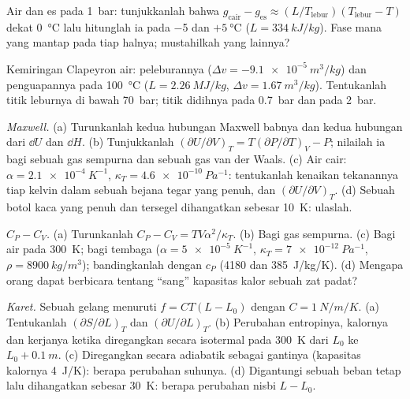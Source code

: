 \begin{exercise}[$\star$]\label{exo:b2:thermodynamic-potentials:3}
Air dan es pada \qty{1}{bar}: tunjukkanlah bahwa $g_{\text{cair}} - g_{\text{es}} \approx
(L/T_{\text{lebur}})(T_{\text{lebur}} - T)$ dekat \qty{0}{\celsius} lalu hitunglah ia
pada \qty{-5}{} dan $+\qty{5}{\celsius}$ ($L = \qty{334}{kJ/kg}$). Fase mana yang
mantap pada tiap halnya; mustahilkah yang lainnya?
\end{exercise}

\begin{exercise}[$\star$]\label{exo:b2:thermodynamic-potentials:4}
Kemiringan Clapeyron air: peleburannya ($\Delta v = -\qty{9.1e-5}{m^3/kg}$) dan
penguapannya pada \qty{100}{\celsius} ($L = \qty{2.26}{MJ/kg}$, $\Delta v =
\qty{1.67}{m^3/kg}$). Tentukanlah titik leburnya di bawah \qty{70}{bar}; titik didihnya pada
\qty{0.7}{bar} dan pada \qty{2}{bar}.
\end{exercise}

\begin{exercise}[$\star\star$]\label{exo:b2:thermodynamic-potentials:5}
\emph{Maxwell.} (a) Turunkanlah kedua hubungan Maxwell babnya
dan kedua hubungan dari $\dd U$ dan $\dd H$. (b) Tunjukkanlah $(\partial U/\partial V)_T =
T(\partial P/\partial T)_V - P$; nilailah ia bagi sebuah gas sempurna dan sebuah gas van
der Waals. (c) Air cair: $\alpha = \qty{2.1e-4}{K^{-1}}$, $\kappa_T =
\qty{4.6e-10}{Pa^{-1}}$: tentukanlah kenaikan tekanannya tiap kelvin dalam sebuah bejana tegar yang penuh,
dan $(\partial U/\partial V)_T$. (d) Sebuah botol kaca yang penuh dan tersegel dihangatkan
sebesar \qty{10}{K}: ulaslah.
\end{exercise}

\begin{exercise}[$\star\star$]\label{exo:b2:thermodynamic-potentials:6}
\emph{$C_P - C_V$.} (a) Turunkanlah $C_P - C_V = TV\alpha^2/\kappa_T$. (b)
Bagi gas sempurna. (c) Bagi air pada \qty{300}{K}; bagi tembaga ($\alpha = \qty{5e-5}{K^{-1}}$,
$\kappa_T = \qty{7e-12}{Pa^{-1}}$, $\rho = \qty{8900}{kg/m^3}$); bandingkanlah dengan
$c_P$ (\qty{4180}{} dan \qty{385}{J/kg/K}). (d) Mengapa orang dapat berbicara tentang
``sang'' kapasitas kalor sebuah zat padat?
\end{exercise}

\begin{exercise}[$\star\star$]\label{exo:b2:thermodynamic-potentials:7}
\emph{Karet.} Sebuah gelang menuruti $f = CT(L - L_0)$ dengan $C = \qty{1}{N/m/K}$.
(a) Tentukanlah $(\partial S/\partial L)_T$ dan $(\partial U/\partial L)_T$. (b) Perubahan
entropinya, kalornya dan kerjanya ketika diregangkan secara isotermal pada \qty{300}{K} dari
$L_0$ ke $L_0 + \qty{0.1}{m}$. (c) Diregangkan secara adiabatik sebagai gantinya (kapasitas
kalornya \qty{4}{J/K}): berapa perubahan suhunya. (d) Digantungi sebuah beban tetap
lalu dihangatkan sebesar \qty{30}{K}: berapa perubahan nisbi $L - L_0$.
\end{exercise}

